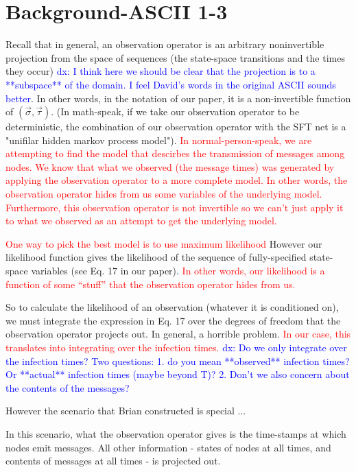 \documentclass{article}
\begin{document}
\section{Background-ASCII 1-3}

	Recall that in general, an observation operator is an arbitrary
	noninvertible projection from the space of sequences (the state-space
	transitions and the times they occur) \textcolor{blue}{dx: I think here we should be
	clear that the projection is to a **subspace** of the domain. I feel David's words in
	the original ASCII sounds better}. In other words, in the notation
	of our paper, it is a non-invertible function of $(\vec{\sigma},
	\vec{\tau})$. (In math-speak, if we take our observation operator to be
	deterministic, the combination of our observation operator with the
	SFT net is a "unifilar hidden markov process model").  \textcolor{red}{In
	normal-person-speak, we are attempting to find the model that descirbes
	the transmission of messages among nodes.  We know that what we
	observed (the message times) was generated  by applying the observation
	operator to a more complete model.  In other words, the observation operator
	hides from us some variables of the underlying model.  Furthermore, this
	observation operator is not invertible so we can't just apply it to what we observed
	as an attempt to get the underlying model.}

	\textcolor{red}{One way to pick the best model is to use maximum
	likelihood} However our likelihood function gives the likelihood of
	the sequence of fully-specified state-space variables (see Eq. 17
	in our paper). \textcolor{red}{In other words, our likelihood is a
	function of some ``stuff'' that the observation operator hides from us.}

	So to calculate the likelihood of an observation (whatever it is
	conditioned on), we must integrate the expression in Eq. 17 over the
	degrees of freedom that the observation operator projects out. In
	general, a horrible problem.  \textcolor{red}{In our case, this translates
	into integrating over the infection times.} \textcolor{blue}{dx: Do we only 
	integrate over the infection times? Two questions: 1. do you mean **observed**
	infection times? Or **actual** infection times (maybe beyond T)? 
	2. Don't we also concern about the contents of the messages?}

	However the scenario that Brian constructed is special ...

	In this scenario, what the observation operator gives is the
	time-stamps at which nodes emit messages. All other information -
	states of nodes at all times, and contents of messages at all times -
	is projected out.
\end{document}
